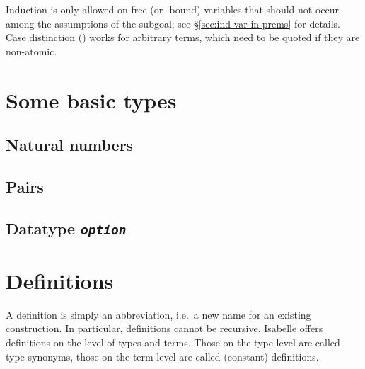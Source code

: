 \begin{exercise}\label{ex:Tree}
%
\end{exercise}



\begin{warn}
  Induction is only allowed on free (or \isasymAnd-bound) variables that
  should not occur among the assumptions of the subgoal; see
  {\S}\ref{sec:ind-var-in-prems} for details. Case distinction
  () works for arbitrary terms, which need to be
  quoted if they are non-atomic.
\end{warn}




\section{Some basic types}


\subsection{Natural numbers}
\label{sec:nat}






\subsection{Pairs}


\subsection{Datatype {\tt\slshape option}}
\label{sec:option}


\section{Definitions}
\label{sec:Definitions}

A definition is simply an abbreviation, i.e.\ a new name for an existing
construction. In particular, definitions cannot be recursive. Isabelle offers
definitions on the level of types and terms. Those on the type level are
called type synonyms, those on the term level are called (constant)
definitions.


